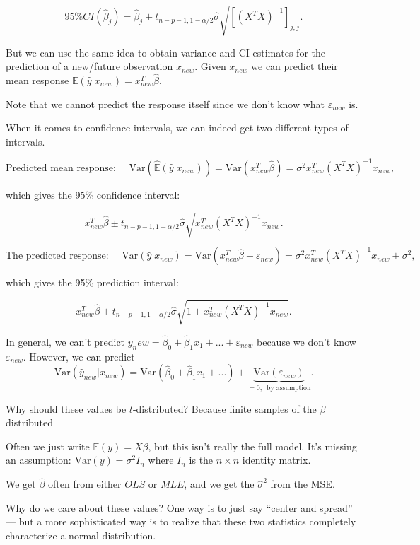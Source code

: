 \documentclass[
  letterpaper,
  DIV=11,
  numbers=noendperiod]{scrreport}
\begin{document}
\[95\%CI(\hat \beta_j) = \hat \beta_j \pm t_{n-p-1, 1-\alpha/2} \hat \sigma \sqrt{[(X^TX)^{-1}]_{j,j}}.\]

But we can use the same idea to obtain variance and CI estimates for the
prediction of a new/future observation \(x_{new}\). Given \(x_{new}\) we
can predict their mean response
\(\mathbb E(\hat y|x_{new}) = x^T_{new}\hat \beta\).

Note that we cannot predict the response itself since we don't know what
\(\varepsilon_{new}\) is.

When it comes to confidence intervals, we can indeed get two different
types of intervals.

\[\text{Predicted mean response: } \quad \text{Var}(\hat{\mathbb E}(\hat y|x_{new})) = 
\text{Var}(x_{new}^T \hat \beta) = \sigma^2 x^T_{new} (X^TX)^{-1} x_{new},\]

which gives the 95\% confidence interval:

\[x_{new}^T \hat \beta \pm t_{n-p-1,1-\alpha/2} \hat \sigma \sqrt{x_{new}^T (X^TX)^{-1} x_{new}}.\]

\[\text{The predicted response: }
\quad \text{Var}(\hat y|x_{new}) = \text{Var}(x_{new}^T \hat \beta + \varepsilon_{new}) = \sigma^2 x_{new}^T (X^TX)^{-1}x_{new} + \sigma^2,\]

which gives the 95\% {prediction} interval:

\[x_{new}^T \hat \beta \pm t_{n-p-1, 1-\alpha/2} \hat \sigma \sqrt{1 + x_{new}^T(X^TX)^{-1}x_{new}}.\]

In general, we can't predict
\(y_new = \hat \beta_0 + \hat \beta_1 x_1 + ... + \varepsilon_{new}\)
because we don't know \(\varepsilon_{new}\). However, we can predict
\[\text{Var}(\hat y_{new}|x_{new}) = \text{Var}(\hat \beta_0 + \hat \beta_1 x_1 + ...) + \underbrace{\text{Var}(\varepsilon_{new})}_{=0,\, \text{ by assumption}}.\]

Why should these values be \(t\)-distributed? Because finite samples of
the \(\beta\) distributed

Often we just write \(\mathbb E(y) = X\beta\), but this isn't really the
full model. It's missing an assumption: \(\text{Var}(y) = \sigma^2I_n\)
where \(I_n\) is the \(n \times n\) identity matrix.

We get \(\hat \beta\) often from either \(OLS\) or \(MLE\), and we get
the \(\hat \sigma^2\) from the MSE.

Why do we care about these values? One way is to just say ``center and
spread'' --- but a more sophisticated way is to realize that these two
statistics completely characterize a normal distribution.
\end{document}
